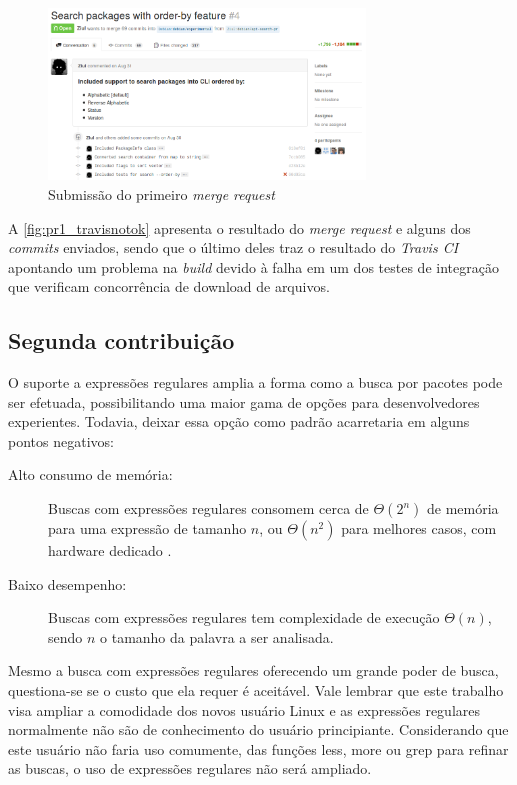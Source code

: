 \begin{figure}[h]
  \centering
	\includegraphics[width=0.75\textwidth]{figuras/pr1}
  \caption{Submissão do primeiro \textit{merge request}}
  \label{fig:pr1_travisnotok}
\end{figure}

A \autoref{fig:pr1_travisnotok} apresenta o resultado do \textit{merge request} e alguns dos \textit{commits} enviados, sendo que o último deles traz o resultado do \textit{Travis CI} apontando um problema na \textit{build} devido à falha em um dos testes de integração que verificam concorrência de download de arquivos.



\subsection{Segunda contribuição} %
\label{sec:segunda_contribui_o}

O suporte a expressões regulares amplia a forma como a busca por pacotes pode ser efetuada, possibilitando uma maior gama de opções para desenvolvedores experientes. Todavia, deixar essa opção como padrão acarretaria em alguns pontos negativos:

\begin{description}
	\item [Alto consumo de memória:] Buscas com expressões regulares consomem cerca de $\Theta(2^n)$ de memória para uma expressão de tamanho $n$, ou $\Theta(n^2)$ para melhores casos, com hardware dedicado \cite{sidhu2001fast}.
	\item [Baixo desempenho:] Buscas com expressões regulares tem complexidade de execução $\Theta(n)$, sendo $n$ o tamanho da palavra a ser analisada.
\end{description}

Mesmo a busca com expressões regulares oferecendo um grande poder de busca, questiona-se se o custo que ela requer é aceitável. Vale lembrar que este trabalho visa ampliar a comodidade dos novos usuário Linux e as expressões regulares normalmente não são de conhecimento do usuário principiante. Considerando que este usuário não faria uso comumente, das funções {\code less}, {\code more} ou {\code grep} para refinar as buscas,  o uso de expressões regulares não será ampliado.

